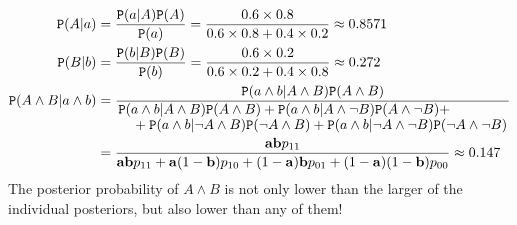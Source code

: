 \documentclass{ifcolog}
\newcommand{\pr}[1]{\mbox{$\mathtt{P}(#1)$}}
\newcommand{\n}{\neg}
\newcommand{\et}{\wedge}
\begin{document}
 \begin{align*}
 \pr{A\vert a} & = \frac{\pr{a\vert A}\pr{A}}{\pr{a}} = \frac{0.6\times 0.8}{0.6\times 0.8 + 0.4\times 0.2}\approx 0.8571 \\
 \pr{B\vert b} & = \frac{\pr{b\vert B}\pr{B}}{\pr{b}} = \frac{0.6\times 0.2}{0.6\times 0.2 + 0.4\times 0.8}\approx 0.272 \\
 \pr{A\et B \vert a \et b} & = \frac{\pr{a\et b\vert A \et B}\pr{A\et B}}{\splitfrac{\pr{a\et b \vert A\et B}\pr{A\et B}+
   \pr{a\et b\vert A\et \n B}\pr{A\et \n B} +}{+ 
 \pr{a\et b \vert \n A \et B}\pr{\n A \et B} + \pr{a\et b \vert \n A \et \n B}\pr{\n A \et \n B}}} \\
 & = \frac{\mathbf{ab}p_{11}}{
   \mathbf{ab}p_{11} + \mathbf{a}(1-\mathbf{b})p_{10} + (1-\mathbf{a})\mathbf{b}p_{01} + (1-\mathbf{a})(1-\mathbf{b})p_{00}
 }  
    \approx 0.147
 \end{align*}
The posterior probability of $A\et B$ is not only lower than the larger of the individual posteriors, but also lower than any of them! 
\end{document}
